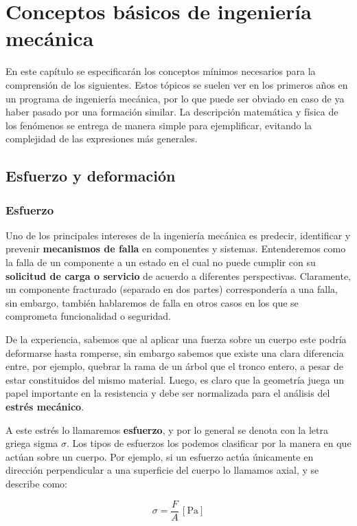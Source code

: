 \chapter{Conceptos básicos de ingeniería mecánica}

En este capítulo se especificarán los conceptos mínimos necesarios para la comprensión de los siguientes. Estos tópicos se suelen ver en los primeros años en un programa de ingeniería mecánica, por lo que puede ser obviado en caso de ya haber pasado por una formación similar. La descripción matemática y física de los fenómenos se entrega de manera simple para ejemplificar, evitando la complejidad de las expresiones más generales.

\section{Esfuerzo y deformación}

\subsection{Esfuerzo}

Uno de los principales intereses de la ingeniería mecánica es predecir, identificar y prevenir \textbf{mecanismos de falla} en componentes y sistemas. Entenderemos como la falla de un componente a un estado en el cual no puede cumplir con su \textbf{solicitud de carga o servicio} de acuerdo a diferentes perspectivas. Claramente, un componente fracturado (separado en dos partes) correspondería a una falla, sin embargo, también hablaremos de falla en otros casos en los que se comprometa funcionalidad o seguridad.

De la experiencia, sabemos que al aplicar una fuerza sobre un cuerpo este podría deformarse hasta romperse, sin embargo sabemos que existe una clara diferencia entre, por ejemplo, quebrar la rama de un árbol que el tronco entero, a pesar de estar constituidos del mismo material. Luego, es claro que la geometría juega un papel importante en la resistencia y debe ser normalizada para el análisis del \textbf{estrés mecánico}.

A este estrés lo llamaremos \textbf{esfuerzo}, y por lo general se denota con la letra griega sigma $\sigma$. Los tipos de esfuerzos los podemos clasificar por la manera en que actúan sobre un cuerpo. Por ejemplo, si un esfuerzo actúa únicamente en dirección perpendicular a una superficie del cuerpo lo llamamos axial, y se describe como:

\begin{equation}
    \sigma = \frac{F}{A}\,\mathrm{[Pa]}
    \label{eq1}
\end{equation}

